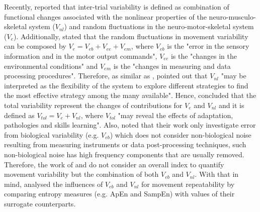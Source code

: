 Recently, \cite{preatoni2007, preatoni2010, preatoni2013} reported 
that inter-trial variability is defined as combination of functional changes 
associated with the nonlinear properties of the neuro-musculo-skeletal system ($V_{nl}$)
and random fluctuations in the neuro-motor-skeletal system ($V_e$).
Additionally, \citealt[p. 72]{preatoni2013} stated that the random fluctuations 
in movement variability can be composed by $V_{e}=V_{eb}+V_{ee}+V_{em}$,
where $V_{eb}$ is the "error in the sensory information and in the motor 
output commands",
$V_{ee}$ is the "changes in the environmental conditions" and 
$V_{em}$ is the "changes in measuring and data processing procedures".
Therefore, as similar as \cite{hatze1986}, \citealt[p. 77]{preatoni2013} 
pointed out that $V_{nl}$ "may be interpreted as the flexibility of the 
system to explore different strategies to find the most effective 
strategy among the many available".
Hence, \citealt[p. 1328]{preatoni2010} concluded that the total variability 
represent the changes of contributions for $V_e$ and $V_{nl}$ 
and it is defined as $V_{tol}=V_e+V_{nl}$, where $V_{tol}$ 
"may reveal the effects of adaptation, pathologies and skills learning".
Also, \cite{preatoni2013} noted that their work only investigate error from 
biological variability (e.g. $V_{eb}$) which does not consider non-biological noise 
resulting from measuring instruments or data post-processing techniques, such 
non-biological noise has high frequency components that are usually removed.
Therefore, the work of \cite{preatoni2010} and \cite{preatoni2013} 
do not consider an overall index to quantify movement variability but 
the combination of both $V_{eb}$ and $V_{nl}$. 
With that in mind, \cite{preatoni2007} analysed the influences of 
$V_{eb}$ and $V_{nl}$ for movement repeatability by comparing entropy measures 
(e.g. ApEn and SampEn) with values of their surrogate counterparts.


